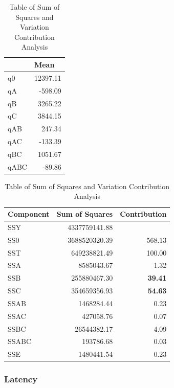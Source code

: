\documentclass[11pt,a4paper]{article}
\begin{document}
\begin{table}[H]
	\begin{minipage}{.5\linewidth}
	\caption{Table of q values}
	\centering
	\begin{tabular}{|l|r|}
		\hline
		& \multicolumn{1}{l|}{Mean} \\ \hline
		q0 & 12397.11 \\ \hline
		qA & -598.09 \\ \hline
		qB & 3265.22 \\ \hline
		qC & 3844.15 \\ \hline
		qAB & 247.34 \\ \hline
		qAC & -133.39 \\ \hline
		qBC & 1051.67 \\ \hline
		qABC & -89.86 \\ \hline
	\end{tabular}
	\end{minipage}%
	\begin{minipage}{.5\linewidth}
	\caption{Table of Sum of Squares and Variation Contribution Analysis}
	\centering
	\begin{tabular}{|l|r|r|}
		\hline
		Component & \multicolumn{1}{l|}{Sum of Squares} & \multicolumn{1}{l|}{Contribution} \\ \hline
		SSY & 4337759141.88 & \multicolumn{1}{l|}{} \\ \hline
		SS0 & 3688520320.39 & 568.13 \\ \hline
		SST & 649238821.49 & 100.00 \\ \hline
		SSA & 8585043.67 & 1.32 \\ \hline
		SSB & 255880467.30 & \textbf{39.41}\\ \hline
		SSC & 354659356.93 & \textbf{54.63} \\ \hline
		SSAB & 1468284.44 & 0.23 \\ \hline
		SSAC & 427058.76 & 0.07 \\ \hline
		SSBC & 26544382.17 & 4.09 \\ \hline
		SSABC & 193786.68 & 0.03 \\ \hline
		SSE & 1480441.54 & 0.23 \\ \hline
	\end{tabular}
	\end{minipage} 
\end{table}

\subsubsection{Latency}
\end{document}

